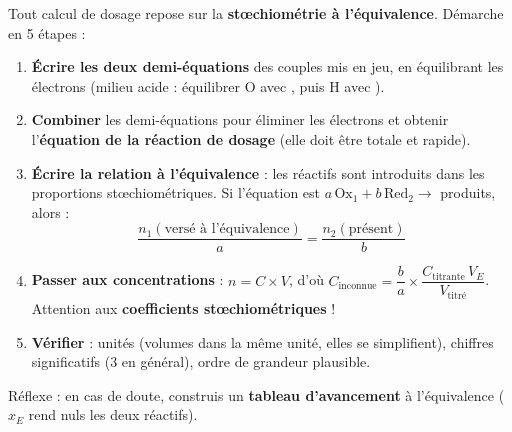 \documentclass[11pt]{article}
\begin{document}
\begin{methode}
Tout calcul de dosage repose sur la \textbf{stœchiométrie à l'équivalence}. Démarche en 5 étapes :
\begin{enumerate}
\item \textbf{Écrire les deux demi-équations} des couples mis en jeu, en équilibrant les électrons (milieu acide : équilibrer O avec , puis H avec ).
\item \textbf{Combiner} les demi-équations pour éliminer les électrons et obtenir l'\textbf{équation de la réaction de dosage} (elle doit être totale et rapide).
\item \textbf{Écrire la relation à l'équivalence} : les réactifs sont introduits dans les proportions stœchiométriques. Si l'équation est $a\,\text{Ox}_1 + b\,\text{Red}_2 \rightarrow$ produits, alors :
\[ \frac{n_1(\text{versé à l'équivalence})}{a} = \frac{n_2(\text{présent})}{b} \]
\item \textbf{Passer aux concentrations} : $n = C \times V$, d'où $C_{\text{inconnue}} = \dfrac{b}{a}\times\dfrac{C_{\text{titrante}}\,V_E}{V_{\text{titré}}}$. Attention aux \textbf{coefficients stœchiométriques} !
\item \textbf{Vérifier} : unités (volumes dans la même unité, elles se simplifient), chiffres significatifs (3 en général), ordre de grandeur plausible.
\end{enumerate}
Réflexe : en cas de doute, construis un \textbf{tableau d'avancement} à l'équivalence ($x_E$ rend nuls les deux réactifs).
\end{methode}
\end{document}
